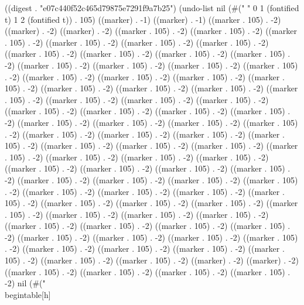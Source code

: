 
((digest . "e07c440f52c465d79875e7291f9a7b25") (undo-list nil (#("
 " 0 1 (fontified t) 1 2 (fontified t)) . 105) ((marker) . -1) ((marker) . -1) ((marker . 105) . -2) ((marker) . -2) ((marker) . -2) ((marker . 105) . -2) ((marker . 105) . -2) ((marker . 105) . -2) ((marker . 105) . -2) ((marker . 105) . -2) ((marker . 105) . -2) ((marker . 105) . -2) ((marker . 105) . -2) ((marker . 105) . -2) ((marker . 105) . -2) ((marker . 105) . -2) ((marker . 105) . -2) ((marker . 105) . -2) ((marker . 105) . -2) ((marker . 105) . -2) ((marker . 105) . -2) ((marker . 105) . -2) ((marker . 105) . -2) ((marker . 105) . -2) ((marker . 105) . -2) ((marker . 105) . -2) ((marker . 105) . -2) ((marker . 105) . -2) ((marker . 105) . -2) ((marker . 105) . -2) ((marker . 105) . -2) ((marker . 105) . -2) ((marker . 105) . -2) ((marker . 105) . -2) ((marker . 105) . -2) ((marker . 105) . -2) ((marker . 105) . -2) ((marker . 105) . -2) ((marker . 105) . -2) ((marker . 105) . -2) ((marker . 105) . -2) ((marker . 105) . -2) ((marker . 105) . -2) ((marker . 105) . -2) ((marker . 105) . -2) ((marker . 105) . -2) ((marker . 105) . -2) ((marker . 105) . -2) ((marker . 105) . -2) ((marker . 105) . -2) ((marker . 105) . -2) ((marker . 105) . -2) ((marker . 105) . -2) ((marker . 105) . -2) ((marker . 105) . -2) ((marker . 105) . -2) ((marker . 105) . -2) ((marker . 105) . -2) ((marker . 105) . -2) ((marker . 105) . -2) ((marker . 105) . -2) ((marker . 105) . -2) ((marker . 105) . -2) ((marker . 105) . -2) ((marker . 105) . -2) ((marker . 105) . -2) ((marker . 105) . -2) ((marker . 105) . -2) ((marker . 105) . -2) ((marker . 105) . -2) ((marker . 105) . -2) ((marker . 105) . -2) ((marker . 105) . -2) ((marker . 105) . -2) ((marker . 105) . -2) ((marker . 105) . -2) ((marker . 105) . -2) ((marker . 105) . -2) ((marker . 105) . -2) ((marker . 105) . -2) ((marker . 105) . -2) ((marker . 105) . -2) ((marker) . -2) ((marker) . -2) ((marker . 105) . -2) ((marker . 105) . -2) ((marker . 105) . -2) ((marker . 105) . -2) nil (#("\\begin{table}[h]
